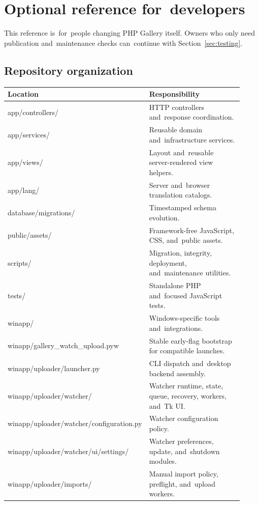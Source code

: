 \documentclass[11pt,a4paper]{article}
\begin{document}

\section{Optional reference for~developers}
\label{sec:development}

This reference is~for~people changing PHP Gallery itself. Owners who only need
publication and~maintenance checks can~continue with Section~\ref{sec:testing}.

\subsection{Repository organization}

\begin{longtable}{>{\ttfamily}p{0.27\linewidth}p{0.65\linewidth}}
\toprule
\textrm{Location} & \textrm{Responsibility}\\
\midrule
\endhead
app/controllers/ & HTTP controllers and~response coordination.\\
app/services/ & Reusable domain and~infrastructure services.\\
app/views/ & Layout and~reusable server-rendered view helpers.\\
app/lang/ & Server and~browser translation catalogs.\\
database/migrations/ & Timestamped schema evolution.\\
public/assets/ & Framework-free JavaScript, CSS, and~public assets.\\
scripts/ & Migration, integrity, deployment, and~maintenance utilities.\\
tests/ & Standalone PHP and~focused JavaScript tests.\\
winapp/ & Windows-specific tools and~integrations.\\
winapp/gallery\_watch\_upload.pyw & Stable early-flag bootstrap for compatible launches.\\
winapp/uploader/launcher.py & CLI dispatch and~desktop backend assembly.\\
winapp/uploader/watcher/ & Watcher runtime, state, queue, recovery, workers, and~Tk UI.\\
winapp/uploader/watcher/configuration.py & Watcher configuration policy.\\
winapp/uploader/watcher/ui/settings/ & Watcher preferences, update, and~shutdown modules.\\
winapp/uploader/imports/ & Manual import policy, preflight, and~upload workers.\\

\end{longtable}
\end{document}
